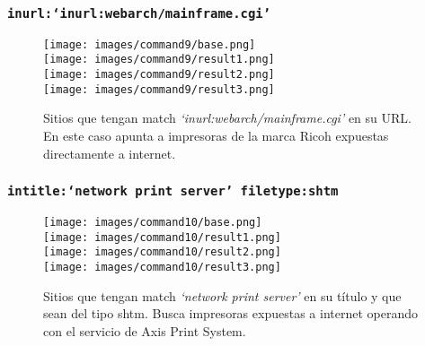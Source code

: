 \documentclass[11pt]{utalcaDoc}
\begin{document}
\subsubsection{\texttt{inurl:\enquote*{inurl:webarch/mainframe.cgi}}}
\begin{figure}[H]
	\centering
\begin{multicols}{4}
	\texttt{[image: images/command9/base.png]}\\
	\texttt{[image: images/command9/result1.png]}\\
	\texttt{[image: images/command9/result2.png]}\\
	\texttt{[image: images/command9/result3.png]}\\
\end{multicols}
\caption{Sitios que tengan match \textit{\enquote*{inurl:webarch/mainframe.cgi}} en su URL. En este caso apunta a impresoras de la marca Ricoh expuestas directamente a internet.}
\label{FIG:command9}
\end{figure}



\subsubsection{\texttt{intitle:\enquote*{network print server} filetype:shtm}}
\begin{figure}[H]
	\centering
\begin{multicols}{4}
	\texttt{[image: images/command10/base.png]}\\
	\texttt{[image: images/command10/result1.png]}\\
	\texttt{[image: images/command10/result2.png]}\\
	\texttt{[image: images/command10/result3.png]}\\
\end{multicols}
\caption{Sitios que tengan match \textit{\enquote*{network print server}} en su título y que sean del tipo shtm. Busca impresoras expuestas a internet operando con el servicio de Axis Print System.}
\label{FIG:command10}
\end{figure}
\end{document}
